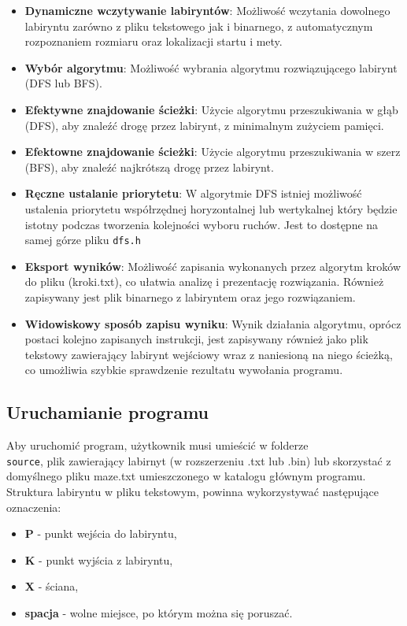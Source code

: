 \documentclass{article}
\begin{document}
\begin{itemize}
    \item \textbf{Dynamiczne wczytywanie labiryntów}: Możliwość wczytania dowolnego labiryntu zarówno z pliku tekstowego jak i binarnego, z automatycznym rozpoznaniem rozmiaru oraz lokalizacji startu i mety.
    \item \textbf{Wybór algorytmu}: Możliwość wybrania algorytmu rozwiązującego labirynt (DFS lub BFS).
    \item \textbf{Efektywne znajdowanie ścieżki}: Użycie algorytmu przeszukiwania w głąb (DFS), aby znaleźć drogę przez labirynt, z minimalnym zużyciem pamięci.
    \item \textbf{Efektowne znajdowanie ścieżki}: Użycie algorytmu przeszukiwania w szerz (BFS), aby znaleźć najkrótszą drogę przez labirynt.
    \item \textbf{Ręczne ustalanie priorytetu}: W algorytmie DFS istniej możliwość ustalenia priorytetu współrzędnej horyzontalnej lub wertykalnej który będzie istotny podczas tworzenia kolejności wyboru ruchów. Jest to dostępne na samej górze pliku \texttt{dfs.h}
    \item \textbf{Eksport wyników}: Możliwość zapisania wykonanych przez algorytm kroków do pliku (kroki.txt), co ułatwia analizę i prezentację rozwiązania. Również zapisywany jest plik binarnego z labiryntem oraz jego rozwiązaniem.
    \item \textbf{Widowiskowy sposób zapisu wyniku}: Wynik działania algorytmu, oprócz postaci kolejno zapisanych instrukcji, jest zapisywany również jako plik tekstowy zawierający labirynt wejściowy wraz z naniesioną na niego ścieżką, co umożliwia szybkie sprawdzenie rezultatu wywołania programu.
\end{itemize}

\subsection{Uruchamianie programu}

Aby uruchomić program, użytkownik musi umieścić w folderze \texttt{\\source}, plik zawierający labirnyt (w rozszerzeniu .txt lub .bin) lub skorzystać z domyślnego pliku maze.txt umieszczonego w katalogu głównym programu. Struktura labiryntu w pliku tekstowym, powinna wykorzystywać następujące oznaczenia:

\begin{itemize}
    \item \textbf{P} - punkt wejścia do labiryntu,
    \item \textbf{K} - punkt wyjścia z labiryntu,
    \item \textbf{X} - ściana,
    \item \textbf{spacja} - wolne miejsce, po którym można się poruszać.
\end{itemize}
\end{document}
